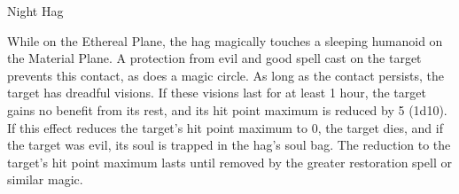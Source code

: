 \begin{monsterbox}{Night Hag}
\begin{monsteraction}
While on the Ethereal Plane, the hag magically touches a sleeping humanoid on the Material Plane. A protection from evil and good spell cast on the target prevents this contact, as does a magic circle. As long as the contact persists, the target has dreadful visions. If these visions last for at least 1 hour, the target gains no benefit from its rest, and its hit point maximum is reduced by 5 (1d10). If this effect reduces the target's hit point maximum to 0, the target dies, and if the target was evil, its soul is trapped in the hag's soul bag. The reduction to the target's hit point maximum lasts until removed by the greater restoration spell or similar magic.
\end{monsteraction}
\end{monsterbox}